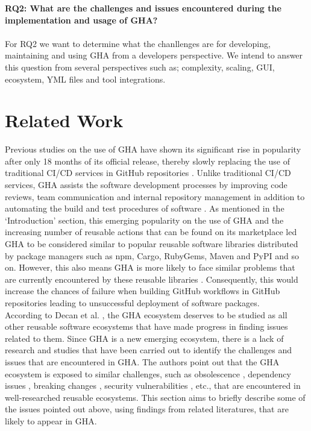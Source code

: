 \documentclass[conference]{IEEEtran}
\begin{document}
     \textbf{RQ2: What are the challenges and issues encountered during the implementation and usage of GHA?}\\
\\
For RQ2 we want to determine what the chanllenges are for developing, maintaining and using GHA from a developers perspective. We intend to answer this question from several perspectives such as; complexity, scaling, GUI, ecosystem, YML files and tool integrations.


\section{Related Work}
Previous studies on the use of GHA have shown its significant rise in popularity after only 18 months of its official release, thereby slowly replacing the use of traditional CI/CD services in GitHub repositories \cite{b15}. Unlike traditional CI/CD services, GHA assists the software development processes by improving code reviews, team communication and internal repository management in addition to automating the build and test procedures of software \cite{b16}. As mentioned in the ‘Introduction’ section, this emerging popularity on the use of GHA and the increasing number of reusable actions that can be found on its marketplace led GHA to be considered similar to popular reusable software libraries distributed by package managers such as npm, Cargo, RubyGems, Maven and PyPI and so on. However, this also means GHA is more likely to face similar problems that are currently encountered by these reusable libraries \cite{b4}. Consequently, this would increase the chances of failure when building GitHub workflows in GitHub repositories leading to unsuccessful deployment of software packages. 
\\

According to Decan et al. \cite{b4}, the GHA ecosystem deserves to be studied as all other reusable software ecosystems that have made progress in finding issues related to them. Since GHA is a new emerging ecosystem, there is a lack of research and studies that have been carried out to identify the challenges and issues that are encountered in GHA. The authors point out that the GHA ecosystem is exposed to similar challenges, such as obsolescence \cite{b5} \cite{b6}, dependency issues \cite{b7} \cite{b8} \cite{b9}, breaking changes \cite{b10}\cite{b11}, security vulnerabilities \cite{b12} \cite{b13}, etc., that are encountered in well-researched reusable ecosystems. This section aims to briefly describe some of the issues pointed out above, using findings from related literatures, that are likely to appear in GHA.
\end{document}
